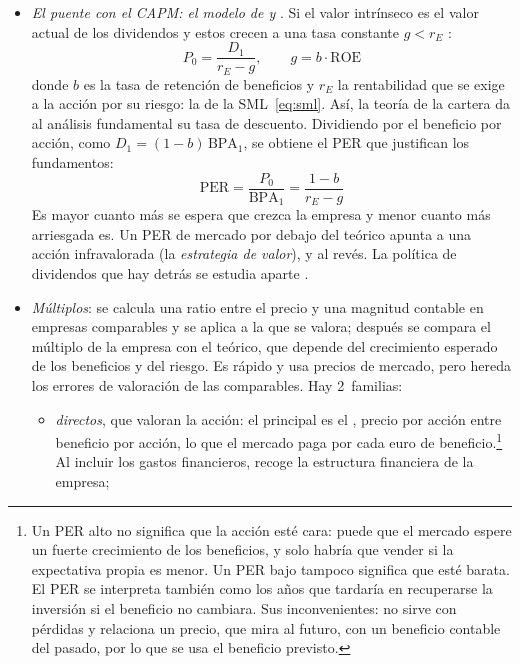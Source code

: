 \documentclass[11pt]{article}
\begin{document}
\begin{itemize}
\begin{itemize}
  \item \emph{dinámicos}, por descuento de flujos: el valor de una acción es el valor actual de lo que generará. Con flujos de caja libres descontados al coste medio ponderado del capital se obtiene el valor de la empresa, y restando la deuda neta, el de las acciones ;
  \item \emph{relativos}, por múltiplos de empresas comparables.
  \end{itemize}
\item \emph{El puente con el CAPM: el modelo de  y }. Si el valor intrínseco es el valor actual de los dividendos y estos crecen a una tasa constante $g<r_E$ :
  \begin{equation}\label{eq:gordon}
  P_0=\frac{D_1}{r_E-g},\qquad g=b\cdot\mathrm{ROE}
  \end{equation}
  donde $b$ es la tasa de retención de beneficios y $r_E$ la rentabilidad que se exige a la acción por su riesgo: la de la SML~\eqref{eq:sml}. Así, la teoría de la cartera da al análisis fundamental su tasa de descuento. Dividiendo por el beneficio por acción, como $D_1=(1-b)\,\mathrm{BPA}_1$, se obtiene el PER que justifican los fundamentos:
  \begin{equation}\label{eq:per-teorico}
  \mathrm{PER}=\frac{P_0}{\mathrm{BPA}_1}=\frac{1-b}{r_E-g}
  \end{equation}
  Es mayor cuanto más se espera que crezca la empresa y menor cuanto más arriesgada es. Un PER de mercado por debajo del teórico apunta a una acción infravalorada (la \emph{estrategia de valor}), y al revés. La política de dividendos que hay detrás se estudia aparte .
\item \emph{Múltiplos}: se calcula una ratio entre el precio y una magnitud contable en empresas comparables y se aplica a la que se valora; después se compara el múltiplo de la empresa con el teórico, que depende del crecimiento esperado de los beneficios y del riesgo. Es rápido y usa precios de mercado, pero hereda los errores de valoración de las comparables\nocite{BadenesSantos1999Multiplos}. Hay 2~familias\nocite{Vernimmen2017Corporate}:
  \begin{itemize}
  \item \emph{directos}, que valoran la acción: el principal es el , precio por acción entre beneficio por acción, lo que el mercado paga por cada euro de beneficio.\footnote{Un PER alto no significa que la acción esté cara: puede que el mercado espere un fuerte crecimiento de los beneficios, y solo habría que vender si la expectativa propia es menor. Un PER bajo tampoco significa que esté barata. El PER se interpreta también como los años que tardaría en recuperarse la inversión si el beneficio no cambiara. Sus inconvenientes: no sirve con pérdidas y relaciona un precio, que mira al futuro, con un beneficio contable del pasado, por lo que se usa el beneficio previsto.} Al incluir los gastos financieros, recoge la estructura financiera de la empresa;

\end{itemize}
\end{itemize}
\end{document}
